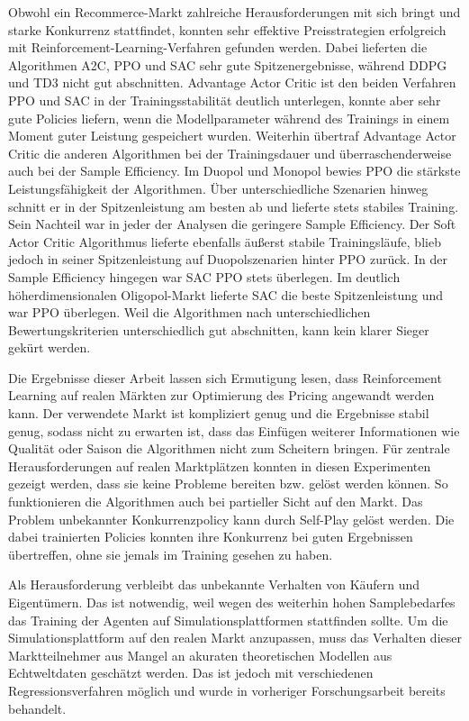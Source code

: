 Obwohl ein Recommerce-Markt zahlreiche Herausforderungen mit sich bringt und starke Konkurrenz stattfindet, konnten sehr effektive Preisstrategien erfolgreich mit Reinforcement-Learning-Verfahren gefunden werden.
Dabei lieferten die Algorithmen A2C, PPO und SAC sehr gute Spitzenergebnisse, während DDPG und TD3 nicht gut abschnitten.
Advantage Actor Critic ist den beiden Verfahren PPO und SAC in der Trainingsstabilität deutlich unterlegen, konnte aber sehr gute Policies liefern, wenn die Modellparameter während des Trainings in einem Moment guter Leistung gespeichert wurden.
Weiterhin übertraf Advantage Actor Critic die anderen Algorithmen bei der Trainingsdauer und überraschenderweise auch bei der Sample Efficiency.
Im Duopol und Monopol bewies PPO die stärkste Leistungsfähigkeit der Algorithmen.
Über unterschiedliche Szenarien hinweg schnitt er in der Spitzenleistung am besten ab und lieferte stets stabiles Training.
Sein Nachteil war in jeder der Analysen die geringere Sample Efficiency.
Der Soft Actor Critic Algorithmus lieferte ebenfalls äußerst stabile Trainingsläufe, blieb jedoch in seiner Spitzenleistung auf Duopolszenarien hinter PPO zurück.
In der Sample Efficiency hingegen war SAC PPO stets überlegen.
Im deutlich höherdimensionalen Oligopol-Markt lieferte SAC die beste Spitzenleistung und war PPO überlegen.
Weil die Algorithmen nach unterschiedlichen Bewertungskriterien unterschiedlich gut abschnitten, kann kein klarer Sieger gekürt werden.

Die Ergebnisse dieser Arbeit lassen sich Ermutigung lesen, dass Reinforcement Learning auf realen Märkten zur Optimierung des Pricing angewandt werden kann.
Der verwendete Markt ist kompliziert genug und die Ergebnisse stabil genug, sodass nicht zu erwarten ist, dass das Einfügen weiterer Informationen wie Qualität oder Saison die Algorithmen nicht zum Scheitern bringen.
Für zentrale Herausforderungen auf realen Marktplätzen konnten in diesen Experimenten gezeigt werden, dass sie keine Probleme bereiten bzw. gelöst werden können.
So funktionieren die Algorithmen auch bei partieller Sicht auf den Markt.
Das Problem unbekannter Konkurrenzpolicy kann durch Self-Play gelöst werden.
Die dabei trainierten Policies konnten ihre Konkurrenz bei guten Ergebnissen übertreffen, ohne sie jemals im Training gesehen zu haben.

Als Herausforderung verbleibt das unbekannte Verhalten von Käufern und Eigentümern.
Das ist notwendig, weil wegen des weiterhin hohen Samplebedarfes das Training der Agenten auf Simulationsplattformen stattfinden sollte.
Um die Simulationsplattform auf den realen Markt anzupassen, muss das Verhalten dieser Marktteilnehmer aus Mangel an akuraten theoretischen Modellen aus Echtweltdaten geschätzt werden.
Das ist jedoch mit verschiedenen Regressionsverfahren möglich und wurde in vorheriger Forschungsarbeit bereits behandelt.

